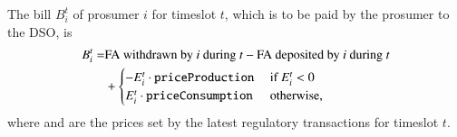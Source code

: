 The bill $B_i^t$ of prosumer $i$ for timeslot $t$, which is to be paid by the prosumer to the DSO, is
\begin{align*}
B_i^t = &  \text{FA withdrawn by $i$ during $t$} - \text{FA deposited by $i$ during $t$} \\
 & + \begin{cases}
- E_i^t \cdot \texttt{priceProduction} & \text{ if } E_i^t < 0 \\
 E_i^t \cdot \texttt{priceConsumption} & \text{ otherwise,} 
\end{cases}
\end{align*}
where {} and {} are the prices set by the latest regulatory transactions for timeslot $t$.

